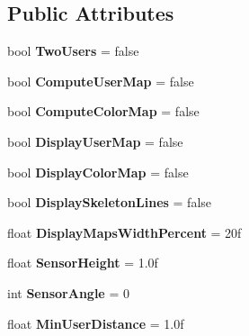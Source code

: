 \subsection*{Public Attributes}
\begin{DoxyCompactItemize}
\item 
\mbox{\label{class_kinect_manager_a879ec008deb45c758eeca8864039dfc7}} 
bool {\bfseries Two\+Users} = false
\item 
\mbox{\label{class_kinect_manager_a8e6e5e0d04f23445d1720def7ccbe3d2}} 
bool {\bfseries Compute\+User\+Map} = false
\item 
\mbox{\label{class_kinect_manager_a28dd356e585e5c93352e284123ca31d2}} 
bool {\bfseries Compute\+Color\+Map} = false
\item 
\mbox{\label{class_kinect_manager_ade9fc37e5708d4c917928abe1172a38b}} 
bool {\bfseries Display\+User\+Map} = false
\item 
\mbox{\label{class_kinect_manager_ab31b9e8dd0c28a6a83b1015b56f98c5a}} 
bool {\bfseries Display\+Color\+Map} = false
\item 
\mbox{\label{class_kinect_manager_a94977f0342f0cb171273630e7ea9f8f6}} 
bool {\bfseries Display\+Skeleton\+Lines} = false
\item 
\mbox{\label{class_kinect_manager_a395d0a5ec2e523353aab6b9990d3658d}} 
float {\bfseries Display\+Maps\+Width\+Percent} = 20f
\item 
\mbox{\label{class_kinect_manager_ab2866c2eb8d810fb4f4011e379cacf37}} 
float {\bfseries Sensor\+Height} = 1.\+0f
\item 
\mbox{\label{class_kinect_manager_a51cae469c515bb03dbfb2b7927e008e0}} 
int {\bfseries Sensor\+Angle} = 0
\item 
\mbox{\label{class_kinect_manager_ab37fba532b9d678a6b94ebbfd0c3ce5d}} 
float {\bfseries Min\+User\+Distance} = 1.\+0f
\item 

\end{DoxyCompactItemize}

